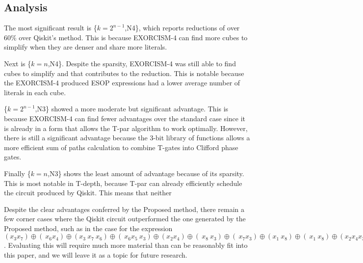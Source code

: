 \subsection{Analysis}
The most significant result is \{$k=2^{n-1}$,N4\}, which reports reductions of over 60\% over
Qiskit's method. This is because EXORCISM-4 can find more cubes to simplify when they are denser
and share more literals.

Next is \{$k=n$,N4\}. Despite the sparsity, EXORCISM-4 was still able to find cubes to simplify
and that contributes to the reduction. This is notable because the EXORCISM-4 produced ESOP
expressions had a lower average number of literals in each cube.

\{$k=2^{n-1}$,N3\} showed a more moderate but significant advantage. This is because EXORCISM-4
can find fewer advantages over the standard case since it is already in a form that allows
the T-par algorithm to work optimally. However, there is still a significant advantage because
the 3-bit library of functions allows a more efficient sum of paths calculation to combine
T-gates into Clifford phase gates.

Finally \{$k=n$,N3\} shows the least amount of advantage because of its sparsity. This is most
notable in T-depth, because T-par can already efficiently schedule the circuit produced by Qiskit.
This means that neither 

Despite the clear advantages conferred by the Proposed method, there remain a few corner
cases where the Qiskit circuit outperformed the one generated by the Proposed method, such as
in the case for the expression $(x_3x_7) \oplus (~x_6x_4) \oplus (x_3~x_7~x_6) \oplus (~x_6x_5~x_3) \oplus (x_2x_4) \oplus (~x_8~x_3) \oplus (~x_7x_3) \oplus (x_1~x_8) \oplus (~x_1~x_8) \oplus (x_2x_4x_3) \oplus (x_3x_5) \oplus (~x_7x_6)$.
Evaluating this will require much more material than can be reasonably fit into this paper,
and we will leave it as a topic for future research.

\label{Exp:An}

